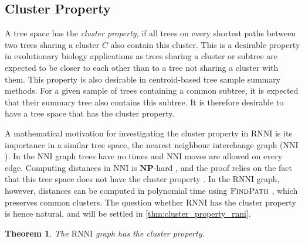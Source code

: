 \documentclass[11pt]{amsart}
\newtheorem{theorem}{Theorem}
\newcommand{\rnni}{\mathrm{RNNI}}
\newcommand{\findpath}{\textsc{FindPath}}
\newcommand{\nni}{\mathrm{NNI}}
\newcommand{\np}{\mathbf{NP}}
\newcommand{\summary}[1]{} %
\begin{document}
\subsection{Cluster Property}
\label{section:cluster_property}
\summary{Definition of Cluster Property and why it is relevant (a bit of bio).}
A tree space has the \emph{cluster property}, if all trees on every shortest paths between two trees sharing a cluster $C$ also contain this cluster.
This is a desirable property in evolutionary biology applications as trees sharing a cluster or subtree are expected to be closer to each other than to a tree not sharing a cluster with them.
This property is also desirable in centroid-based tree sample summary methods.
For a given sample of trees containing a common subtree, it is expected that their summary tree also contains this subtree.
It is therefore desirable to have a tree space that has the cluster property.

\summary{Cluster property in $\nni$ and its connection to the complexity result.}
A mathematical motivation for investigating the cluster property in $\rnni$ is its importance in a similar tree space, the nearest neighbour interchange graph ($\nni$).
In the $\nni$ graph trees have no times and $\nni$ moves are allowed on every edge.
Computing distances in $\nni$ is $\np$-hard \autocite{Dasgupta2000-xa}, and the proof relies on the fact that this tree space does not have the cluster property \autocite{Li1996-zw}.
In the $\rnni$ graph, however, distances can be computed in polynomial time using $\findpath$ \autocite{Collienne2020-iu}, which preserves common clusters.
The question whether $\rnni$ has the cluster property is hence natural, and will be settled in \autoref{thm:cluster_property_rnni}.

\summary{$\rnni$ has the cluster property.}
\begin{theorem}
	The $\rnni$ graph has the cluster property.
	\label{thm:cluster_property_rnni}
\end{theorem}
\end{document}
